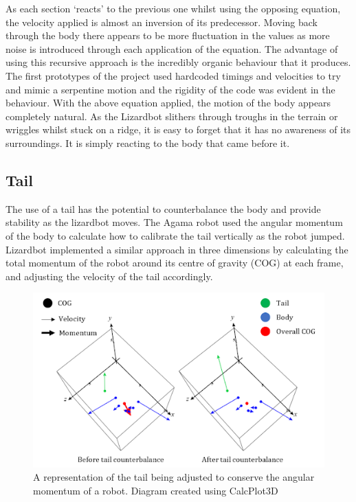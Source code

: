 \documentclass{article}
\begin{document}
As each section ‘reacts’ to the previous one whilst using the opposing equation, the velocity applied is almost an inversion of its predecessor. Moving back through the body there appears to be more fluctuation in the values as more noise is introduced through each application of the equation. The advantage of using this recursive approach is the incredibly organic behaviour that it produces. The first prototypes of the project used hardcoded timings and velocities to try and mimic a serpentine motion and the rigidity of the code was evident in the behaviour. With the above equation applied, the motion of the body appears completely natural. As the Lizardbot slithers through troughs in the terrain or wriggles whilst stuck on a ridge, it is easy to forget that it has no awareness of its surroundings. It is simply reacting to the body that came before it.


\subsection{Tail}
The use of a tail has the potential to counterbalance the body and provide stability as the lizardbot moves. The Agama robot used the angular momentum of the body to calculate how to calibrate the tail vertically as the robot jumped. Lizardbot implemented a similar approach in three dimensions by calculating the total momentum of the robot around its centre of gravity (COG) at each frame, and adjusting the velocity of the tail accordingly.\\ 
\begin{figure}[H]
\centering
\includegraphics[scale=0.6]{tailMomentum}
\caption{A representation of the tail being adjusted to conserve the angular momentum of a robot. Diagram created using CalcPlot3D \citep{diagrams}}
\end{figure}
\end{document}
